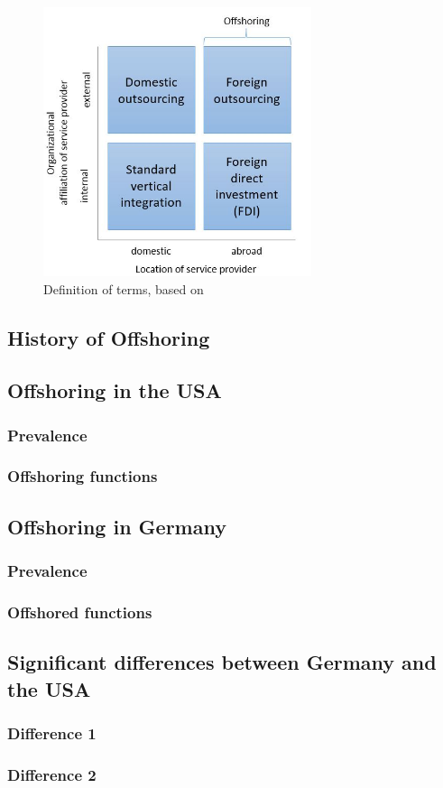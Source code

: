 \begin{figure}[htb]
	\centering
	\includegraphics[width=0.7\textwidth]{Pictures/Terms_definition}
	\caption{Definition of terms, based on \cite[pp. 552f]{Antras.2004}}
	\label{fig:DefTerms}
\end{figure}



\subsection{History of Offshoring}
%

\subsection{Offshoring in the USA}

\subsubsection{Prevalence}

\subsubsection{Offshoring functions}

\subsection{Offshoring in Germany}

\subsubsection{Prevalence}

\subsubsection{Offshored functions}

\subsection{Significant differences between Germany and the USA}

\subsubsection{Difference 1}

\subsubsection{Difference 2}
